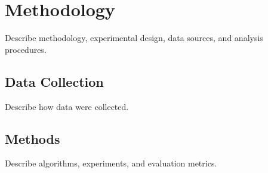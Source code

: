 \chapter{Methodology}
\label{ch:method}

Describe methodology, experimental design, data sources, and analysis procedures.

\section{Data Collection}
Describe how data were collected.

\section{Methods}
Describe algorithms, experiments, and evaluation metrics.
